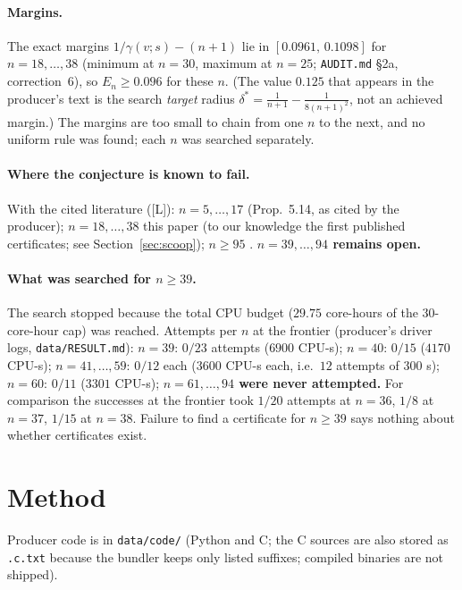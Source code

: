 \documentclass[10pt]{article}
\newcommand{\tier}[1]{\textsf{[#1]}}
\newcommand{\tL}{\tier{L}}
\begin{document}
\paragraph{Margins.} The exact margins $1/\gamma(v;s)-(n+1)$ lie in $[0.0961,\,0.1098]$ for $n=18,\dots,38$ (minimum at $n=30$, maximum at $n=25$; \texttt{AUDIT.md} \S2a, correction~6), so $E_n\ge0.096$ for these $n$. (The value $0.125$ that appears in the producer's text is the search \emph{target} radius $\delta^\ast=\frac1{n+1}-\frac1{8(n+1)^2}$, not an achieved margin.) The margins are too small to chain from one $n$ to the next, and no uniform rule was found; each $n$ was searched separately.

\paragraph{Where the conjecture is known to fail.} With the cited literature (\tL{}): $n=5,\dots,17$ \cite{bcs} (Prop.~5.14, as cited by the producer); $n=18,\dots,38$ this paper (to our knowledge the first published certificates; see Section~\ref{sec:scoop}); $n\ge95$ \cite{pol}. \textbf{$n=39,\dots,94$ remains open.}

\paragraph{What was searched for $n\ge39$.} The search stopped because the total CPU budget ($29.75$ core-hours of the $30$-core-hour cap) was reached. Attempts per $n$ at the frontier (producer's driver logs, \texttt{data/RESULT.md}): $n=39$: $0/23$ attempts ($6900$ CPU-s); $n=40$: $0/15$ ($4170$ CPU-s); $n=41,\dots,59$: $0/12$ each ($3600$ CPU-s each, i.e.\ $12$ attempts of $300$ s); $n=60$: $0/11$ ($3301$ CPU-s); \textbf{$n=61,\dots,94$ were never attempted.} For comparison the successes at the frontier took $1/20$ attempts at $n=36$, $1/8$ at $n=37$, $1/15$ at $n=38$. Failure to find a certificate for $n\ge39$ says nothing about whether certificates exist.

\section{Method}\label{sec:method}
Producer code is in \texttt{data/code/} (Python and C; the C sources are also stored as \texttt{.c.txt} because the bundler keeps only listed suffixes; compiled binaries are not shipped).
\end{document}
